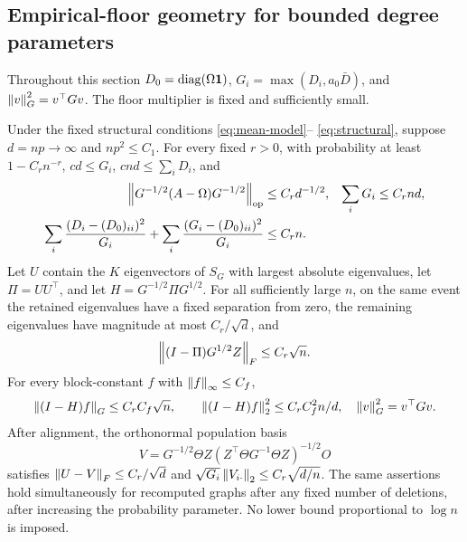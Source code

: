 \subsection{Empirical-floor geometry for bounded degree parameters}
Throughout this section $D_0=\operatorname{diag}(\Omega\mathbf 1)$,
$G_i=\max(D_i,a_0\bar D)$, and $\left\lVert v\right\rVert_G^2=v^\top Gv$.
The floor multiplier is fixed and sufficiently small.
\begin{proposition}\label{prop:sparse-floor}
Under the fixed structural conditions \eqref{eq:mean-model}--%
\eqref{eq:structural}, suppose $d=np\to\infty$ and $np^2\le C_1$.
For every fixed $r>0$, with probability at least $1-C_rn^{-r}$,
$cd\le G_i$, $cnd\le\sum_iD_i$, and
\begin{align}
 \left\lVert G^{-1/2}(A-\Omega)G^{-1/2}\right\rVert_{\mathrm{op}}&\le C_r d^{-1/2},
 &\sum_iG_i&\le C_rnd,\label{eq:floor-noise}\\
 \sum_i\frac{(D_i-(D_0)_{ii})^2}{G_i}
 +\sum_i\frac{(G_i-(D_0)_{ii})^2}{G_i}
 &\le C_rn.\label{eq:floor-degree-energy}
\end{align}
Let $U$ contain the $K$ eigenvectors of $S_G$ with largest absolute
eigenvalues, let $\Pi=UU^\top$, and let
$H=G^{-1/2}\Pi G^{1/2}$. For all sufficiently large $n$, on the same
event the retained eigenvalues have a fixed separation from zero, the
remaining eigenvalues have magnitude at most $C_r/\sqrt d$, and
\begin{equation}\label{eq:floor-block-residual}
 \left\lVert(I-\Pi)G^{1/2}Z\right\rVert_F\le C_r\sqrt n.
\end{equation}
For every block-constant $f$ with $\left\lVert f\right\rVert_\infty\le C_f$,
\begin{equation}\label{eq:floor-weighted-errors}
 \left\lVert(I-H)f\right\rVert_G\le C_rC_f\sqrt n,\qquad
 \left\lVert(I-H)f\right\rVert_2^2\le C_rC_f^2n/d,
 \quad \left\lVert v\right\rVert_G^2=v^\top Gv.
\end{equation}
After alignment, the orthonormal population basis
\[
 V=G^{-1/2}\Theta Z
       (Z^\top\Theta G^{-1}\Theta Z)^{-1/2}O
\]
satisfies $\left\lVert U-V\right\rVert_F\le C_r/\sqrt d$ and
$\sqrt{G_i}\left\lVert V_{i\cdot}\right\rVert_2\le C_r\sqrt{d/n}$.
The same assertions hold simultaneously for recomputed graphs after
any fixed number of deletions, after increasing the probability
parameter. No lower bound proportional to $\log n$ is imposed.
\end{proposition}


